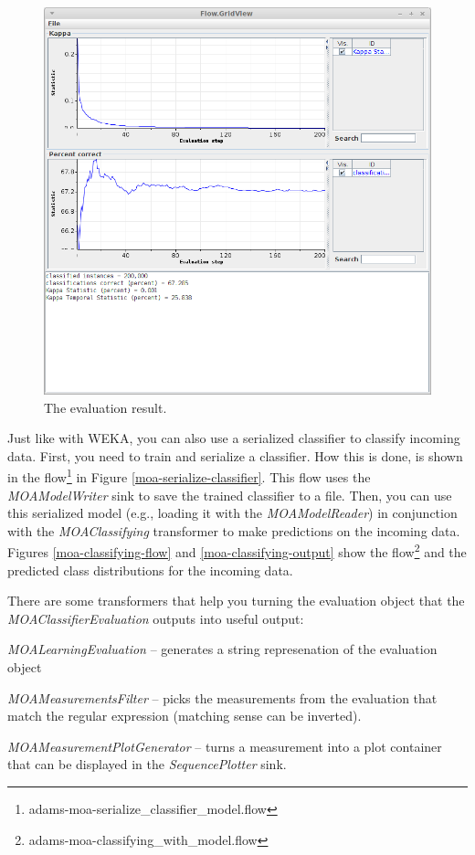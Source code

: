 \documentclass[a4paper]{book}
\begin{document}
\begin{figure}[htb]
  \centering
  \includegraphics[width=12.0cm]{images/moa-classifier-output.png}
  \caption{The evaluation result.}
  \label{moa-classifier-output}
\end{figure}

\clearpage
Just like with WEKA, you can also use a serialized classifier to classify 
incoming data. First, you need to train and serialize a classifier. How this
is done, is shown in the flow\footnote{adams-moa-serialize\_classifier\_model.flow} 
in Figure \ref{moa-serialize-classifier}.
This flow uses the \textit{MOAModelWriter} sink to save the trained classifier
to a file. Then, you can use this serialized model (e.g., loading it with the 
\textit{MOAModelReader}) in conjunction with the 
\textit{MOAClassifying} transformer to make predictions on the incoming data.
Figures \ref{moa-classifying-flow} and \ref{moa-classifying-output} show the
flow\footnote{adams-moa-classifying\_with\_model.flow} and the predicted
class distributions for the incoming data.

There are some transformers that help you turning the evaluation object that
the \textit{MOAClassifierEvaluation} outputs into useful output:
\begin{tight_itemize}
	\item \textit{MOALearningEvaluation} -- generates a string represenation of
	the evaluation object
	\item \textit{MOAMeasurementsFilter} -- picks the measurements from the
	evaluation that match the regular expression (matching sense can be inverted).
	\item \textit{MOAMeasurementPlotGenerator} -- turns a measurement into a
	plot container that can be displayed in the \textit{SequencePlotter} sink.
\end{tight_itemize}
\end{document}
